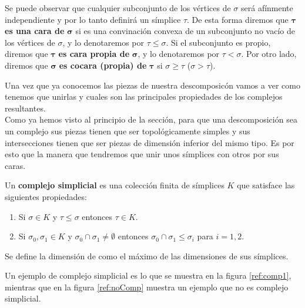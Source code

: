 Se puede observar que cualquier subconjunto de los vértices de $\sigma$ será afínmente independiente y por lo tanto definirá un símplice $\tau$. De esta forma diremos que $\bm{\tau}$ \textbf{es una cara de} $\bm{\sigma}$ si es una convinación convexa de un subconjunto no vacío de los vértices de $\sigma$, y lo denotaremos por $\tau \leq \sigma$. Si el subconjunto es propio, diremos que $\bm{\tau}$ \textbf{es cara propia de} $\bm{\sigma}$, y lo denotaremos por $\tau < \sigma$. Por otro lado, diremos que $\bm{\sigma}$ \textbf{es cocara (propia) de} $\bm{\tau}$ si $\sigma \geq \tau$ ($\sigma > \tau$).

Una vez que ya conocemos las piezas de nuestra descomposicón vamos a ver como tenemos que unirlas y cuales son las principales propiedades de los complejos resultantes.\\
Como ya hemos visto al principio de la sección, para que una descomposición sea un complejo sus piezas tienen que ser topológicamente simples y sus intersecciones tienen que ser piezas de dimensión inferior del mismo tipo. Es por esto que la manera que tendremos que unir unos símplices con otros por sus caras.

\begin{definition}
Un \textbf{complejo simplicial} es una colección finita de símplices $K$ que satisface las siguientes propiedades:
\begin{enumerate}
	\item Si $\sigma \in K$ y $\tau \leq \sigma$ entonces $\tau \in K$.
	\item Si $\sigma_0,\sigma_1 \in K$ y $\sigma_0 \cap \sigma_1 \neq \emptyset$ entonces $\sigma_0 \cap \sigma_1 \leq \sigma_i$ para $i = 1,2$.
\end{enumerate}
\end{definition}

Se define la dimensión de como el máximo de las dimensiones de sus símplices.

Un ejemplo de complejo simplicial es lo que se muestra en la figura \ref{ref:comp1}, mientras que en la figura \ref{ref:noComp} muestra un ejemplo que no es complejo simplicial.



